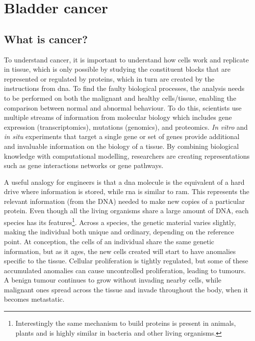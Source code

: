 
\section{Bladder cancer} \label{s:lit:biology}

\vspace{3mm}
\vspace{3mm}

\subsection{What is cancer?}

To understand cancer, it is important to understand how cells work and replicate in tissue, which is only possible by studying the constituent blocks that are represented or regulated by proteins, which in turn are created by the instructions from \acrfull{dna}. To find the faulty biological processes, the analysis needs to be performed on both the malignant and healthy cells/tissue, enabling the comparison between normal and abnormal behaviour. To do this, scientists use multiple streams of information from molecular biology which includes gene expression (transcriptomics), mutations (genomics), and proteomics. \textit{In vitro} and \textit{in situ} experiments that target a single gene or set of genes provide additional and invaluable information on the biology of a tissue. By combining biological knowledge with computational modelling, researchers are creating representations such as gene interactions networks or gene pathways. 

A useful analogy for engineers is that a \acrshort{dna} molecule is the equivalent of a hard drive where information is stored, while \acrfull{rna} is similar to \acrfull{ram}. This represents the relevant information (from the DNA) needed to make new copies of a particular protein. Even though all the living organisms share a large amount of DNA, each species has its features\footnote{Interestingly the same mechanism to build proteins is present in animals, plants and is highly similar in bacteria and other living organisms.}. Across a species, the genetic material varies slightly, making the individual both unique and ordinary, depending on the reference point. At conception, the cells of an individual share the same genetic information, but as it ages, the new cells created will start to have anomalies specific to the tissue. Cellular proliferation is tightly regulated, but some of these accumulated anomalies can cause uncontrolled proliferation, leading to tumours. A benign tumour continues to grow without invading nearby cells, while malignant ones spread across the tissue and invade throughout the body, when it becomes metastatic. 

